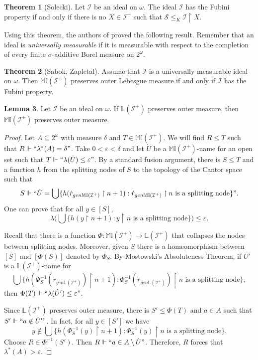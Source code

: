 \documentclass{amsart}
\theoremstyle{definition}
\newtheorem{theorem}{Theorem}[section]
\newtheorem{lemma}[theorem]{Lemma}
\theoremstyle{remark}
\numberwithin{equation}{section}
\newcommand{\li}{\mathbb{L}(\mathcal{I}^+)}
\newcommand{\mil}{\mathbb{MI}}
\newcommand{\id}{\mathcal{I}}
\newcommand{\restr}[2]{#1\upharpoonright {#2}}
\begin{document}
\begin{theorem}[Solecki]
Let $\id$ be an ideal on $\omega$. The ideal $\id$ has the Fubini property if and only if there is no $X\in \id^+$ such that $\mathcal{S}\leq_K \restr{\id}{X}$.
\end{theorem}

Using this theorem, the authors of \cite{sabok} proved the following result. Remember that an ideal is \textit{universally measurable} if it is measurable with respect to the completion of every finite 
$\sigma$-additive Borel measure on $2^\omega$. 

\begin{theorem}[Sabok, Zapletal]\label{miller medida}
Assume that $\id$ is a universally measurable ideal on $\omega$. Then $\mil(\id^+)$ preserves outer Lebesgue measure if and only if $\id$ has the Fubini property.
\end{theorem}

\begin{lemma}\label{li medida implica mi medida}
Let $\id$ be an ideal on $\omega$. If $\li$ preserves outer measure, then $\mil(\id^+)$ preserves outer measure.
\end{lemma}

\begin{proof}
Let $A\subseteq 2^\omega$ with measure $\delta$ and $T\in\mil(\id^+)$. We will find $R\leq T$ such that $R\Vdash``\lambda^*(A)=\delta"$. Take $0<\varepsilon<\delta$ and let $\dot U$ be a $\mil(\id^+)$-name for an open set such that $T\Vdash`` \lambda(\dot U)\leq \varepsilon"$. By a standard fusion argument, there is $S\leq T$ and a function $h$ from the splitting nodes of $S$ to the topology of the Cantor space such that 
\[
S\Vdash``\dot U=\bigcup \{h(\dot r_{gen\mil(\id^+)}\upharpoonright n+1): \dot r_{gen\mil(\id^+)}\upharpoonright n \text{ is a splitting node}\}".
\]
One can prove that for all $y\in [S]$,
\[
\lambda\Big(\bigcup \{h(y\upharpoonright n+1): y\upharpoonright n \text{ is a splitting node}\}\Big)\leq \varepsilon.
\]

Recall that there is a function $\Phi:\mil(\id^+) \to \li$ that collapses the nodes between splitting nodes. Moreover, given $S$ there is a homeomorphism between $[S]$ and $[\Phi(S)]$ denoted by $\Phi_S$. By Mostowski's Absoluteness Theorem, if $\dot U'$ is a $\li$-name for 
\[
\bigcup \{h(\Phi_S^{-1}(\dot r_{gen\li})\upharpoonright n+1): \Phi_S^{-1}(\dot r_{gen\li})\upharpoonright n \text{ is a splitting node}\},
\]
then $\Phi(T)\Vdash``\lambda(\dot U')\leq \varepsilon"$.

Since $\li$ preserves outer measure, there is $S'\leq \Phi(T)$ and $a\in A$ such that $S'\Vdash ``a\notin \dot U'"$. In fact, for all $y\in [S']$ we have 
\[
y\notin \bigcup \{h(\Phi_S^{-1}(y)\upharpoonright n+1): \Phi_S^{-1}(y)\upharpoonright n \text{ is a splitting node}\}.
\]
Choose $R\in \Phi^{-1}(S')$. Then $R\Vdash``a\in A \setminus \dot U"$. Therefore, $R$ forces that $\lambda^*(A)> \varepsilon$.
\end{proof}
\end{document}
